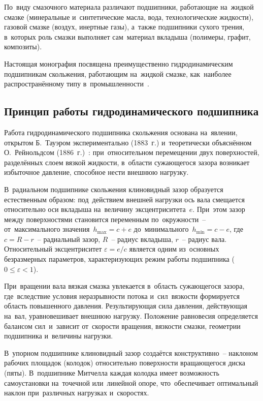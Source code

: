 По~виду смазочного материала различают подшипники, работающие на~жидкой смазке (минеральные и~синтетические масла, вода, технологические жидкости), газовой смазке (воздух, инертные газы), а~также подшипники сухого трения, в~которых роль смазки выполняет сам~материал вкладыша (полимеры, графит, композиты).

Настоящая монография посвящена преимущественно гидродинамическим подшипникам скольжения, работающим на~жидкой смазке, как~наиболее распространённому типу в~промышленности~\cite{hori2002,szeri1998}.

\subsection{Принцип работы гидродинамического подшипника}

Работа гидродинамического подшипника скольжения основана на~явлении, открытом Б.~Тауэром экспериментально (1883~г.) и~теоретически объяснённом О.~Рейнольдсом (1886~г.)~\cite{hori2002,szeri1998}: при~относительном перемещении двух поверхностей, разделённых слоем вязкой жидкости, в~области сужающегося зазора возникает избыточное давление, способное нести внешнюю нагрузку.

В~радиальном подшипнике скольжения клиновидный зазор образуется естественным образом: под~действием внешней нагрузки ось вала смещается относительно оси вкладыша на~величину эксцентриситета~$e$. При~этом зазор между поверхностями становится переменным по~окружности~-- от~максимального значения~$h_{\max} = c + e$ до~минимального~$h_{\min} = c - e$, где~$c = R - r$~-- радиальный зазор, $R$~-- радиус вкладыша, $r$~-- радиус вала. Относительный эксцентриситет $\varepsilon = e / c$ является одним из~основных безразмерных параметров, характеризующих режим работы подшипника ($0 \leq \varepsilon < 1$).

При~вращении вала вязкая смазка увлекается в~область сужающегося зазора, где~вследствие условия неразрывности потока и~сил~вязкости формируется область повышенного давления. Результирующая сила давления, действующая на~вал, уравновешивает внешнюю нагрузку. Положение равновесия определяется балансом сил~и~зависит от~скорости вращения, вязкости смазки, геометрии подшипника и~величины нагрузки.

В~упорном подшипнике клиновидный зазор создаётся конструктивно~-- наклоном рабочих площадок (колодок) относительно поверхности вращающегося диска (пяты). В~подшипнике Митчелла каждая колодка имеет возможность самоустановки на~точечной или~линейной опоре, что~обеспечивает оптимальный наклон при~различных нагрузках и~скоростях.

